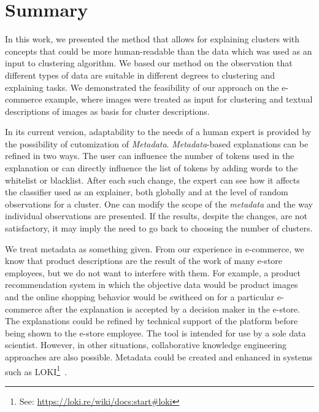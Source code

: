 \documentclass{article}
\begin{document}
\section{Summary}
\label{sec:summary}
In this work, we presented the method that allows for explaining clusters with concepts that could be more human-readable than the data which was used as an input to clustering algorithm.
We based our method on the observation that different types of data are suitable in different degrees to clustering and explaining tasks.
We demonstrated the feasibility of our approach on the e-commerce example, where images were treated as input for clustering and textual descriptions of images as basis for cluster descriptions.

In its current version, adaptability to the needs of a human expert is provided by the possibility of cutomization of \textit{Metadata}.
\textit{Metadata}-based explanations can be refined in two ways.
The user can influence the number of tokens used in the explanation or can directly influence the list of tokens by adding words to the whitelist or blacklist.
After each such change, the expert can see how it affects the classifier used as an explainer, both globally and at the level of random observations for a cluster.
One can modify the scope of the \textit{metadata} and the way individual observations are presented.
If the results, despite the changes, are not satisfactory, it may imply the need to go back to choosing the number of clusters.

We treat metadata as something given.
From our experience in e-commerce, we know that product descriptions are the result of the work of many e-store employees, but we do not want to interfere with them.
For example, a product recommendation system in which the objective data would be product images and the online shopping behavior would be swithced on for a particular e-commerce after the explanation is accepted by a decision maker in the e-store.
The explanations could be refined by technical support of the platform before being shown to the e-store employee.
The tool is intended for use by a sole data scientist.
However, in other situations, collaborative knowledge engineering approaches are also possible.
Metadata could be created and enhanced in systems such as LOKI\footnote{See: \url{https://loki.re/wiki/docs:start\#loki}}~\cite{Kutt16}.
\end{document}

